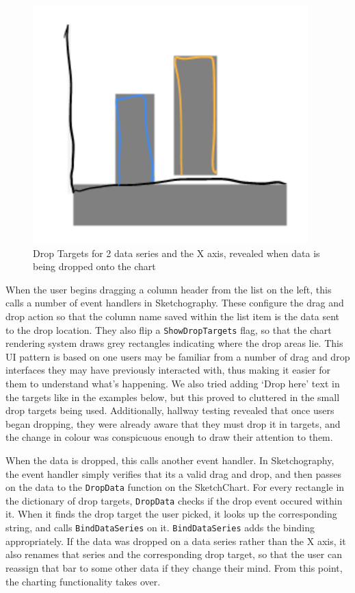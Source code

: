 	\begin{figure}[h]
	\includegraphics[scale=1]{droptargets}
	\caption{Drop Targets for 2 data series and the X axis, revealed when data is being dropped onto the chart}
	\end{figure}
	
	When the user begins dragging a column header from the list on the left, this calls a number of event handlers in Sketchography. These configure the drag and drop action so that the column name saved within the list item is the data sent to the drop location. They also flip a \texttt{ShowDropTargets} flag, so that the chart rendering system draws grey rectangles indicating where the drop areas lie. This UI pattern is based on one users may be familiar from a number of drag and drop interfaces they may have previously interacted with, thus making it easier for them to understand what's happening. We also tried adding `Drop here' text in the targets like in the examples below, but this proved to cluttered in the small drop targets being used. Additionally, hallway testing revealed that once users began dropping, they were already aware that they must drop it in targets, and the change in colour was conspicuous enough to draw their attention to them.
	
	When the data is dropped, this calls another event handler. In Sketchography, the event handler simply verifies that its a valid drag and drop, and then passes on the data to the \texttt{DropData} function on the SketchChart. For every rectangle in the dictionary of drop targets, \texttt{DropData} checks if the drop event occured within it. When it finds the drop target the user picked, it looks up the corresponding string, and calls \texttt{BindDataSeries} on it. \texttt{BindDataSeries} adds the binding appropriately. If the data was dropped on a data series rather than the X axis, it also renames that series and the corresponding drop target, so that the user can reassign that bar to some other data if they change their mind. From this point, the charting functionality takes over.
	

